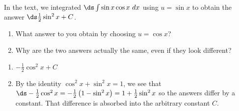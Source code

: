 {In the text, we integrated $\ds \int \sin x \cos x\ dx$ using $u=\sin x$ to obtain the answer $\ds \frac{1}{2}\sin^2 x+C$.\label{exer:06_01_ex_99}
\begin{enumerate}
\item What answer to you obtain by choosing $u=\cos x$?
\item Why are the two answers actually the same, even if they look different?
\end{enumerate}
}
{\begin{enumerate}
\item $-\frac{1}{2}\cos^2 x+C$
\item By the identity $\cos^2 x+\sin^2 x=1$, we see that $\ds -\frac{1}{2}\cos^2 x=-\frac{1}{2}\left(1-\sin^2 x\right)=1+\frac{1}{2}\sin^2 x$ so the answers differ by a constant.  That difference is absorbed into the arbitrary constant $C$.
\end{enumerate}
}

